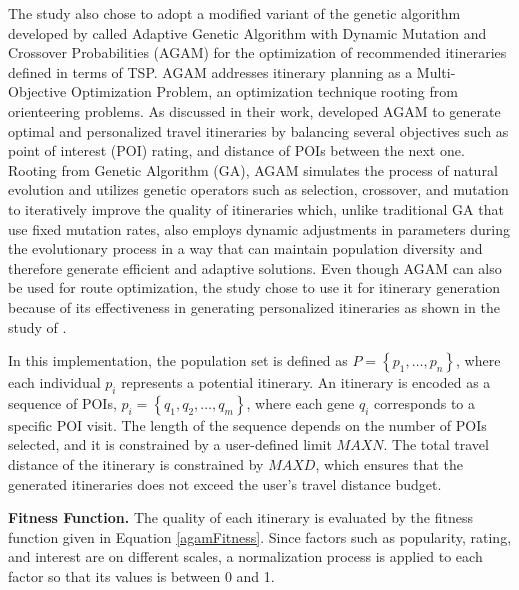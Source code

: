 The study also chose to adopt a modified variant of the genetic algorithm developed by \textcite{Yochum2020} called Adaptive Genetic Algorithm with Dynamic Mutation and Crossover Probabilities (AGAM) for the optimization of recommended itineraries defined in terms of TSP. AGAM addresses itinerary planning as a Multi-Objective Optimization Problem, an optimization technique rooting from orienteering problems. As discussed in their work, \textcite{Yochum2020} developed AGAM to generate optimal and personalized travel itineraries by balancing several objectives such as point of interest (POI) rating, and distance of POIs between the next one. Rooting from Genetic Algorithm (GA), AGAM simulates the process of natural evolution and utilizes genetic operators such as selection, crossover, and mutation to iteratively improve the quality of itineraries which, unlike traditional GA that use fixed mutation rates, also employs dynamic adjustments in parameters during the evolutionary process in a way that can maintain population diversity and therefore generate efficient and adaptive solutions. Even though AGAM can also be used for route optimization, the study chose to use it for itinerary generation because of its effectiveness in generating personalized itineraries as shown in the study of \textcite{Yochum2020}.

In this implementation, the population set is defined as $P = \left\{ p _{1},\dots, p _{n} \right\}$, where each individual $p _{i}$ represents a potential itinerary. An itinerary is encoded as a sequence of POIs, $p _{i}= \left\{ q _{1}, q _{2}, \dots, q _{m} \right\}$, where each gene $q _{i}$ corresponds to a specific POI visit. The length of the sequence depends on the number of POIs selected, and it is constrained by a user-defined limit $MAXN$. The total travel distance of the itinerary is constrained by $MAXD$, which ensures that the generated itineraries does not exceed the user’s travel distance budget. 

\textbf{Fitness Function.} The quality of each itinerary is evaluated by the fitness function given in Equation \ref{agamFitness}. Since factors such as popularity, rating, and interest are on different scales, a normalization process is applied to each factor so that its values is between 0 and 1. 

